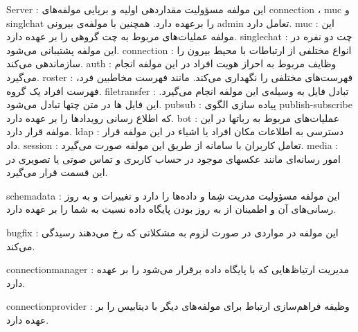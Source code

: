 \begin{itemize}

 Server : این مولفه مسؤولیت مقداردهی اولیه و برپایی مولفه‌های connection ، muc و singlchat را برعهده دارد. همچنین با مولفه‌ی بیرونی admin تعامل دارد.
 muc : این مولفه عملیات‌های مربوط به چت گروهی را بر عهده دارد.
 singlechat : چت دو نفره در این مولفه پشتیبانی می‌شود. 
 connection :  انواع مختلفی از ارتباطات با محیط بیرون را سازماندهی می‌کند.
 auth : وظایف مربوط به احراز هویت افراد در این مولفه انجام می‌گیرد.
 roster : فهرست‌های مختلفی را نگهداری می‌کند. مانند فهرست مخاطبین فرد، فهرست افراد یک گروه.
 filetransfer : تبادل فایل به وسیله‌ی این مولفه انجام می‌گیرد. این فایل ها در متن چتها تبادل می‌شود.
  pubsub : پیاده سازی الگوی publish-subscribe که اطلاع رسانی رویدادها را بر عهده دارد. 
 bot : عملیات‌های مربوط به رباتها در این مولفه قرار دارد.
 ldap : دسترسی به اطلاعات مکان افراد یا اشیاء در این مولفه قرار داد. 
 session : تعامل کاربران با سامانه از طریق این مولفه صورت می‌گیرد.
 media : امور رسانه‌ای مانند عکسهای موجود در حساب کاربری و تماس صوتی یا تصویری در این قسمت قرار می‌گیرد.
\end{itemize}






\begin{itemize}

	

	 schemadata : این مولفه مسؤولیت مدریت شِما و  داده‌ها را دارد و تغییرات و به روز رسانی‌های آن و اطمینان از به روز بودن پایگاه داده نسبت به شما را بر عهده دارد. 

	 bugfix :  این مولفه در مواردی در صورت لزوم به مشکلاتی که رخ می‌دهند رسیدگی می‌کند.

	 connectionmanager :  مدیریت ارتیاظ‌هایی که با پایگاه داده برقرار می‌شود را بر عهده دارد.

	 connectionprovider : وظیفه فراهم‌سازی ارتباط برای مولفه‌های دیگر با دیتابیس را بر عهده دارد.

	

\end{itemize}







